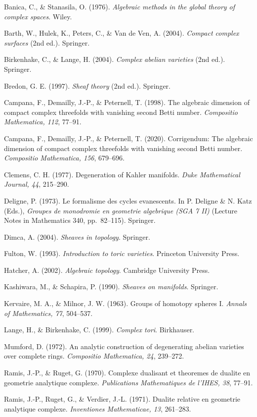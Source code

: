 \documentclass[
  10pt,
  letterpaper,
]{article}
\begin{document}
Banica, C., \& Stanasila, O. (1976). \emph{Algebraic methods in the
global theory of complex spaces}. Wiley.

Barth, W., Hulek, K., Peters, C., \& Van de Ven, A. (2004).
\emph{Compact complex surfaces} (2nd ed.). Springer.

Birkenhake, C., \& Lange, H. (2004). \emph{Complex abelian varieties}
(2nd ed.). Springer.

Bredon, G. E. (1997). \emph{Sheaf theory} (2nd ed.). Springer.

Campana, F., Demailly, J.-P., \& Peternell, T. (1998). The algebraic
dimension of compact complex threefolds with vanishing second Betti
number. \emph{Compositio Mathematica, 112}, 77--91.

Campana, F., Demailly, J.-P., \& Peternell, T. (2020). Corrigendum: The
algebraic dimension of compact complex threefolds with vanishing second
Betti number. \emph{Compositio Mathematica, 156}, 679--696.

Clemens, C. H. (1977). Degeneration of Kahler manifolds. \emph{Duke
Mathematical Journal, 44}, 215--290.

Deligne, P. (1973). Le formalisme des cycles evanescents. In P. Deligne
\& N. Katz (Eds.), \emph{Groupes de monodromie en geometrie algebrique
(SGA 7 II)} (Lecture Notes in Mathematics 340, pp.~82--115). Springer.

Dimca, A. (2004). \emph{Sheaves in topology}. Springer.

Fulton, W. (1993). \emph{Introduction to toric varieties}. Princeton
University Press.

Hatcher, A. (2002). \emph{Algebraic topology}. Cambridge University
Press.

Kashiwara, M., \& Schapira, P. (1990). \emph{Sheaves on manifolds}.
Springer.

Kervaire, M. A., \& Milnor, J. W. (1963). Groups of homotopy spheres I.
\emph{Annals of Mathematics, 77}, 504--537.

Lange, H., \& Birkenhake, C. (1999). \emph{Complex tori}. Birkhauser.

Mumford, D. (1972). An analytic construction of degenerating abelian
varieties over complete rings. \emph{Compositio Mathematica, 24},
239--272.

Ramis, J.-P., \& Ruget, G. (1970). Complexe dualisant et theoremes de
dualite en geometrie analytique complexe. \emph{Publications
Mathematiques de l'IHES, 38}, 77--91.

Ramis, J.-P., Ruget, G., \& Verdier, J.-L. (1971). Dualite relative en
geometrie analytique complexe. \emph{Inventiones Mathematicae, 13},
261--283.
\end{document}
